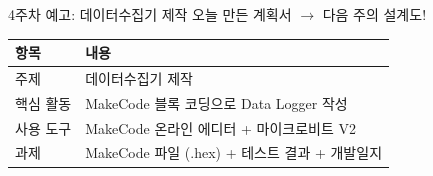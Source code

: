 \documentclass[10pt, aspectratio=169]{beamer}
\begin{document}
\begin{frame}{4주차 예고: 데이터수집기 제작}
오늘 만든 계획서 $\rightarrow$ 다음 주의 설계도!

\vspace{5mm}
\begin{center}
\begin{tabular}{ll}
\toprule
\textbf{항목} & \textbf{내용} \\
\midrule
주제 & 데이터수집기 제작 \\
핵심 활동 & MakeCode 블록 코딩으로 Data Logger 작성 \\
사용 도구 & MakeCode 온라인 에디터 + 마이크로비트 V2 \\
과제 & MakeCode 파일 (.hex) + 테스트 결과 + 개발일지 \\
\bottomrule
\end{tabular}
\end{center}
\end{frame}
\end{document}
